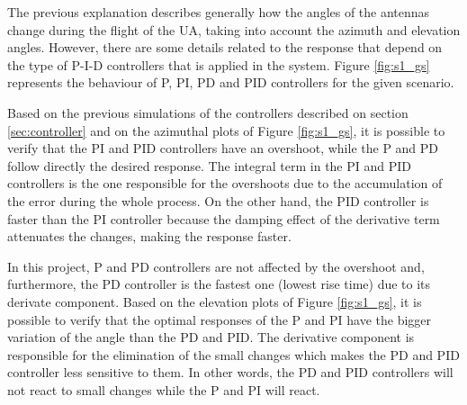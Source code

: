 The previous explanation describes generally how the angles of the antennas change during the flight of the UA, taking into account the azimuth and elevation angles. However, there are some details related to the response that depend on the type of P-I-D controllers that is applied in the system. Figure \ref{fig:s1_gs} represents the behaviour of P, PI, PD and PID controllers for the given scenario.

Based on the previous simulations of the controllers described on section \ref{sec:controller} and on the azimuthal plots of Figure \ref{fig:s1_gs}, it is possible to verify that the PI and PID controllers have an overshoot, while the P and PD follow directly the desired response. The integral term in the PI and PID controllers is the one responsible for the overshoots due to the accumulation of the error during the whole process. On the other hand, the PID controller is faster than the PI controller because the damping effect of the derivative term attenuates the changes, making the response faster.

In this project, P and PD controllers are not affected by the overshoot and, furthermore, the PD controller is the fastest one (lowest rise time) due to its derivate component.
Based on the elevation plots of Figure \ref{fig:s1_gs}, it is possible to verify that the optimal responses of the P and PI have the bigger variation of the angle than the PD and PID. The derivative component is responsible for the elimination of the small changes which makes the PD and PID controller less sensitive to them. In other words, the PD and PID controllers will not react to small changes while the P and PI will react.

